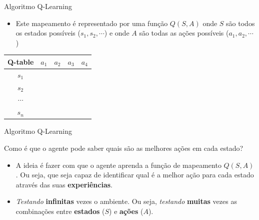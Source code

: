 \documentclass{beamer}
\begin{document}
\begin{frame}{Algoritmo Q-Learning}
	
\begin{itemize}
	
	\item Este mapeamento é representado por uma função $Q(S,A)$ onde $S$ são 
	todos os estados possíveis ($s_{1}, s_{2}, \cdots$) e onde $A$ são todas as 
	ações possíveis ($a_{1}, a_{2}, \cdots$)

\end{itemize}

	\begin{center}
	\begin{tabular}{ |c|c|c|c|c| } 
		\hline
		 \textbf{Q-table}  & $a_{1}$ & $a_{2}$ & $a_{3}$& $a_{4}$ \\
		 \hline
		$s_{1}$&  &  &  & \\ 
		\hline
		$s_{2}$&  &  &  & \\ 
\hline
		$\cdots$&  &  &  & \\ 
\hline
		$s_{n}$&  &  &  & \\ 
\hline
	\end{tabular}
\end{center}

\end{frame}

\begin{frame}{Algoritmo Q-Learning}

	\begin{block}{}
		Como é que o agente pode saber quais são as melhores ações em cada estado?
	\end{block}

\pause

	\begin{itemize}
		\item A ideia é fazer com que o agente aprenda a função de mapeamento $Q(S,A)$. 
		Ou seja, que seja capaz de identificar qual é a melhor ação para cada estado 
		através das suas \textbf{experiências}. 
		\item \textit{Testando} \textbf{infinitas} vezes o ambiente. 
		Ou seja, \textit{testando} \textbf{muitas} vezes as combinações entre 
		\textbf{estados} ($S$) e \textbf{ações} ($A$). 
	\end{itemize}

\end{frame}
\end{document}
